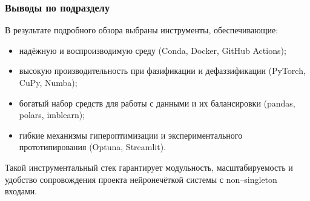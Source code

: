 \subsubsection{Выводы по подразделу}
\label{subsubsec:tool_summary}

В результате подробного обзора выбраны инструменты,
обеспечивающие:
\begin{itemize}
  \item надёжную и воспроизводимую среду (Conda, Docker, GitHub Actions);
  \item высокую производительность при фазификации и дефаззификации
        (PyTorch, CuPy, Numba);
  \item богатый набор средств для работы с данными и их балансировки
        (pandas, polars, imblearn);
  \item гибкие механизмы гипероптимизации и экспериментального
        прототипирования (Optuna, Streamlit).
\end{itemize}

Такой инструментальный стек гарантирует модульность, масштабируемость
и удобство сопровождения проекта нейронечёткой системы
с non–singleton входами.
